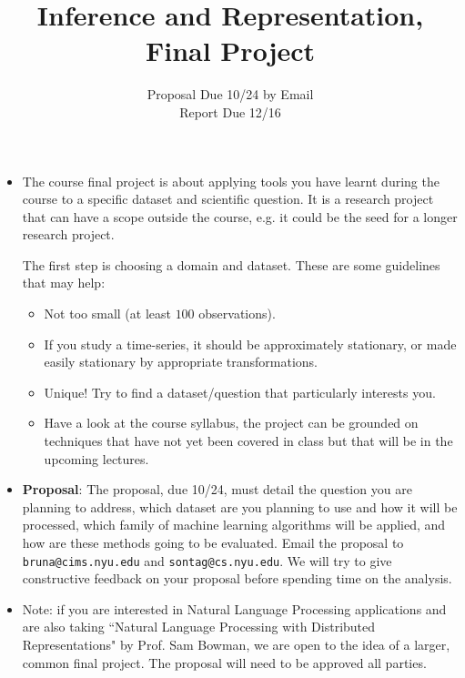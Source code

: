 \documentclass[11pt]{article}
\title{Inference and Representation, Final Project}
\author{Proposal Due 10/24 by Email \\
Report Due 12/16}
\begin{document}
\maketitle

\begin{itemize}
\item The course final project is about applying tools you have learnt during the course to a specific dataset and scientific question. It is a research project that can have a scope outside the course, e.g. it could be the seed for a longer research project. 

The first step is choosing a domain and dataset. These are some guidelines that may help:
\begin{itemize}
\item Not too small (at least $100$ observations).
\item If you study a time-series, it should be approximately stationary, or made easily stationary by appropriate transformations.
\item Unique! Try to find a dataset/question that particularly interests you. 
\item Have a look at the course syllabus, the project can be grounded on techniques that have not yet been covered in class but that will be in the upcoming lectures.
\end{itemize}

\item \textbf{Proposal}: %
The proposal, due 10/24, must detail the question you are planning to address, which dataset are you planning to use and how it will be processed, which family of machine learning algorithms will be applied, and how are these methods going to be evaluated. 
 Email the proposal to \texttt{bruna@cims.nyu.edu} and \texttt{sontag@cs.nyu.edu}. We will try to give constructive feedback on your proposal before spending time on the analysis. 
 
 \item Note: if you are interested in Natural Language Processing applications and are also taking ``Natural Language Processing with Distributed Representations" by Prof. Sam Bowman, we are open to the idea of a larger, common final project. The proposal will need to be approved all parties. 



\end{itemize}
\end{document}
